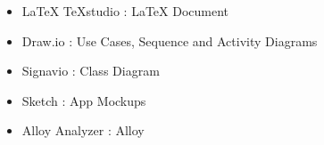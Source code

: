 \begin{itemize}
	\setlength{\leftskip}{1cm}
	\item LaTeX TeXstudio : LaTeX Document
	\item Draw.io : Use Cases, Sequence and Activity Diagrams
	\item Signavio : Class Diagram
	\item Sketch : App Mockups
	\item Alloy Analyzer : Alloy
\end{itemize}